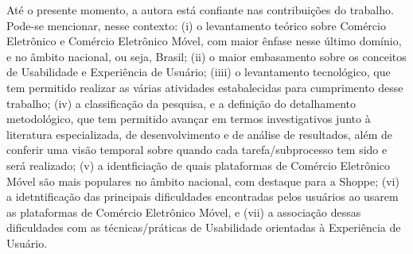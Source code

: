 Até o presente momento, a autora está confiante nas contribuições do trabalho. Pode-se mencionar, nesse contexto: (i) o levantamento teórico sobre Comércio Eletrônico e Comércio Eletrônico Móvel, com maior ênfase nesse último domínio, e no âmbito nacional, ou seja, Brasil; (ii) o maior embasamento sobre os conceitos de Usabilidade e Experiência de Usuário; (iiii) o levantamento tecnológico, que tem permitido realizar as várias atividades estabalecidas para cumprimento desse trabalho; (iv) a classificação da pesquisa, e a definição do detalhamento metodológico, que tem permitido avançar em termos investigativos junto à literatura especializada, de desenvolvimento e de análise de resultados, além de conferir uma visão temporal sobre quando cada tarefa/subprocesso tem sido e será realizado; (v) a identficiação de quais plataformas de Comércio Eletrônico Móvel são mais populares no âmbito nacional, com destaque para a Shoppe; (vi) a idetntificação das principais dificuldades encontradas pelos usuários ao usarem as plataformas de Comércio Eletrônico Móvel, e (vii) a associação dessas dificuldades com as técnicas/práticas de Usabilidade orientadas à Experiência de Usuário.